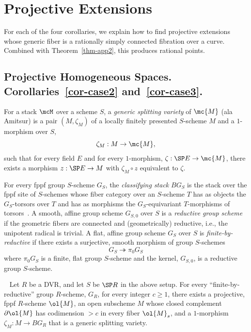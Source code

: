 \section{Projective Extensions} \label{sec-extend}

For each of the four corollaries, we explain how to find projective extensions whose generic fiber is a rationally simply connected fibration over a curve. Combined with Theorem~\ref{thm-app2}, this produces rational points.



\subsection{Projective Homogeneous Spaces. Corollaries~\ref{cor-case2} and~\ref{cor-case3}.}\label{subsec-PHS}

\begin{defi} \label{defn-gs}
For a stack $\mcM$ over a scheme $S$, a \emph{generic splitting variety} of $\mc{M}$ (ala Amitsur) is a pair $(M,\zeta_M)$ of a locally finitely presented $S$-scheme $M$ and a $1$-morphism over $S$,
\[
\zeta_M:M\to \mc{M},
\]
such that for every field $E$ and for every $1$-morphism, $\zeta:\SP E \to
\mc{M}$, there exists a morphism $z:\SP E \to M$ with $\zeta_M\circ z$ equivalent to $\zeta$.
\end{defi}

For every fppf group $S$-scheme $G_S$, the \emph{classifying stack} $BG_S$ is the stack over the fppf site of $S$-schemes whose fiber category over an $S$-scheme $T$ has as objects the $G_S$-torsors over $T$ and has as morphisms the $G_S$-equivariant $T$-morphisms of torsors~\cite[Proposition~10.13.1]{LM-B}. A smooth, affine group scheme $G_{S,0}$ over $S$ is a \emph{reductive group scheme} if the geometric fibers are connected and (geometrically) reductive, i.e., the unipotent radical is trivial. A flat, affine group scheme $G_S$ over $S$ is \emph{finite-by-reductive} if there exists a surjective, smooth morphism of group $S$-schemes
\[
G_S \twoheadrightarrow \pi_0 G_S
\]
where $\pi_0 G_S$ is a finite, flat group $S$-scheme and the kernel, $G_{S,0}$, is a reductive group $S$-scheme.

\begin{theo}
\cite{dJS8}~\cite[Section~16]{dJHS} \label{thm-SdJ}
Let $R$ be a DVR, and let $S$ be $\SP R$ in the above setup. For every ``finite-by-reductive'' group $R$-scheme, $G_R$, for every integer $c\geq 1$, there exists a projective, fppf $R$-scheme $\ol{M}$, an open subscheme $M$ whose closed complement $\partial \ol{M}$ has codimension $>c$ in every fiber $\ol{M}_s$, and a $1$-morphism $\zeta_M:M\to BG_R$ that is a generic splitting variety.
\end{theo}

